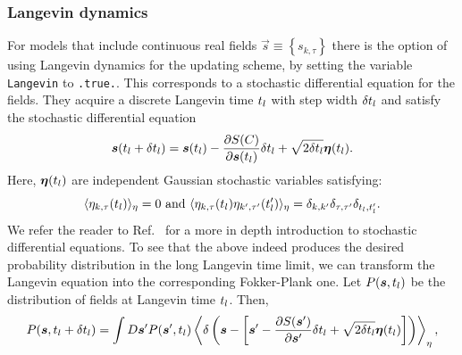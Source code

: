 

\subsubsection{Langevin dynamics}

For models that include continuous real fields $\vec{s} \equiv \left\{s_{k,\tau} \right\}$ there is the option of using Langevin dynamics for the updating scheme, by setting  the variable \texttt{Langevin} to \texttt{.true.}. This corresponds to a  stochastic differential equation for the fields. They acquire a discrete Langevin time $t_{l}$ with step width $\delta t_{l}$ and satisfy the stochastic differential equation
\begin{equation}\label{eqn:langevin}
   \boldsymbol{s}(t_{l} +  \delta t_{l})    =    \boldsymbol{s}(t_{l})    - \frac{\partial S(C) }{\partial    \boldsymbol{s}(t_{l}) }    \delta t_{l}     +\sqrt{2 \delta t_{l} } \boldsymbol{\eta}(t_{l}).
\end{equation}
Here,  $  \boldsymbol{\eta}(t_{l})  $   are  independent Gaussian  stochastic variables  satisfying:
\begin{equation}
        \langle  \eta_{k,\tau}(t_{l}) \rangle_{\eta}  = 0   \text{  and  }    \langle  \eta_{k,\tau}(t_{l})  \eta_{k',\tau'}(t_{l}') \rangle_{\eta}  = \delta_{k,k'} \delta_{\tau,\tau'} \delta_{t_{l},t_{l}'}.
\end{equation}
We refer the reader to  Ref.~\cite{Gardiner}   for a more in depth introduction to stochastic differential equations.
To see that the above  indeed produces the desired probability distribution in the long Langevin time limit, we can transform the Langevin equation into the corresponding Fokker-Plank one.  Let
$P(\boldsymbol{s}, t_{l}) $ be the distribution of fields at Langevin time $t_{l}$. Then,
\begin{equation}
        P(\boldsymbol{s}, t_{l}  + \delta t_{l} )    = \int D\boldsymbol{s}'  P  (\boldsymbol{s}', t_{l}  )    \left\langle    \delta \left(  \boldsymbol{s} - \left[ \boldsymbol{s}'   - \frac{\partial S(\boldsymbol{s}' )}{\partial    \boldsymbol{s}' }   \delta t_{l}     +\sqrt{2 \delta t_{l} } \boldsymbol{\eta}(t_{l})  \right]    \right) \right\rangle_{\eta},
\end{equation}
